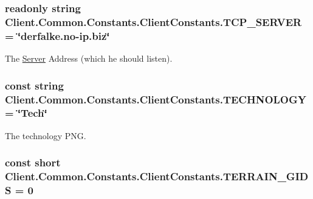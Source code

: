 \subsubsection[{T\+C\+P\+\_\+\+S\+E\+R\+V\+E\+R}]{\setlength{\rightskip}{0pt plus 5cm}readonly string Client.\+Common.\+Constants.\+Client\+Constants.\+T\+C\+P\+\_\+\+S\+E\+R\+V\+E\+R = \char`\"{}derfalke.\+no-\/ip.\+biz\char`\"{}\hspace{0.3cm}{\ttfamily [static]}}\label{classClient_1_1Common_1_1Constants_1_1ClientConstants_aa8e49cc5e62e4e4d0145a391eafb1283}


The \hyperlink{namespaceServer}{Server} Address (which he should listen). 

\hypertarget{classClient_1_1Common_1_1Constants_1_1ClientConstants_aa3ee0e61566e5ac804d7f2d5ba78f29c}{}
\subsubsection[{T\+E\+C\+H\+N\+O\+L\+O\+G\+Y}]{\setlength{\rightskip}{0pt plus 5cm}const string Client.\+Common.\+Constants.\+Client\+Constants.\+T\+E\+C\+H\+N\+O\+L\+O\+G\+Y = \char`\"{}Tech\char`\"{}}\label{classClient_1_1Common_1_1Constants_1_1ClientConstants_aa3ee0e61566e5ac804d7f2d5ba78f29c}


The technology P\+N\+G. 

\hypertarget{classClient_1_1Common_1_1Constants_1_1ClientConstants_abb57eddf6044d2e0c032c08701733e23}{}
\subsubsection[{T\+E\+R\+R\+A\+I\+N\+\_\+\+G\+I\+D\+S}]{\setlength{\rightskip}{0pt plus 5cm}const short Client.\+Common.\+Constants.\+Client\+Constants.\+T\+E\+R\+R\+A\+I\+N\+\_\+\+G\+I\+D\+S = 0}\label{classClient_1_1Common_1_1Constants_1_1ClientConstants_abb57eddf6044d2e0c032c08701733e23}


